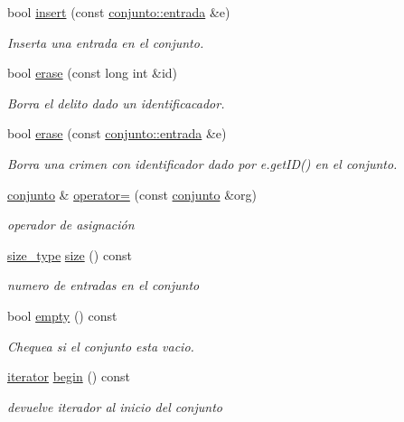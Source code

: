 \begin{DoxyCompactItemize}
bool \hyperlink{classconjunto_aa65b9f7c4cb9bad6d4e40c1973095930}{insert} (const \hyperlink{classconjunto_a09cad766dd65de73e51eae21f9d22585}{conjunto\+::entrada} \&e)
\begin{DoxyCompactList}\small\item\em Inserta una entrada en el conjunto. \end{DoxyCompactList}\item 
bool \hyperlink{classconjunto_ad550177fa4454da3a10fa356417e39a7}{erase} (const long int \&id)
\begin{DoxyCompactList}\small\item\em Borra el delito dado un identificacador. \end{DoxyCompactList}\item 
bool \hyperlink{classconjunto_a77a21ed91f1002f4eaed48d86535a874}{erase} (const \hyperlink{classconjunto_a09cad766dd65de73e51eae21f9d22585}{conjunto\+::entrada} \&e)
\begin{DoxyCompactList}\small\item\em Borra una crimen con identificador dado por e.\+get\+I\+D() en el conjunto. \end{DoxyCompactList}\item 
\hyperlink{classconjunto}{conjunto} \& \hyperlink{classconjunto_a2bdce402a4b76117b68fe71c0dffab87}{operator=} (const \hyperlink{classconjunto}{conjunto} \&org)
\begin{DoxyCompactList}\small\item\em operador de asignación \end{DoxyCompactList}\item 
\hyperlink{classconjunto_a855a5893bb0f5a851ab2dbf2b8aa6cc7}{size\+\_\+type} \hyperlink{classconjunto_a863e1e106e35adda47e7c5e2067295b9}{size} () const 
\begin{DoxyCompactList}\small\item\em numero de entradas en el conjunto \end{DoxyCompactList}\item 
bool \hyperlink{classconjunto_afcf4ff3ff3c1f83b63e901efebe93533}{empty} () const 
\begin{DoxyCompactList}\small\item\em Chequea si el conjunto esta vacio. \end{DoxyCompactList}\item 
\hyperlink{classconjunto_1_1iterator}{iterator} \hyperlink{classconjunto_a2e54b223f217dfb3b175e138fd5901f6}{begin} () const 
\begin{DoxyCompactList}\small\item\em devuelve iterador al inicio del conjunto \end{DoxyCompactList}\item 

\end{DoxyCompactItemize}
